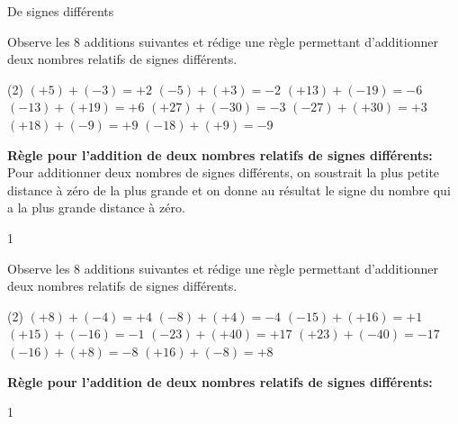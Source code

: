 \documentclass[a4paper,11pt]{report}
\begin{document}



\begin{resolu}
{De signes différents}{Observe les 8 additions suivantes et rédige une règle permettant d'additionner deux nombres relatifs de signes différents.
\begin{tasks}(2)
\task $(+5)+(-3)= +2$
\task $(-5)+(+3)= -2$
\task $(+13)+(-19)= -6$
\task $(-13)+(+19)= +6$
\task $(+27)+(-30)= -3$
\task $(-27)+(+30)= +3$
\task $(+18)+(-9)= +9$
\task $(-18)+(+9)= -9$
\end{tasks}

{\bf Règle pour l'addition de deux nombres relatifs de signes différents:} Pour additionner deux nombres de signes différents, on soustrait la plus petite distance à zéro de la plus grande et on donne au résultat le signe du nombre qui a la plus grande distance à zéro.
}{1}
\end{resolu}

\begin{exop}
{Observe les 8 additions suivantes et rédige une règle permettant d'additionner deux nombres relatifs de signes différents.
\begin{tasks}(2)
\task $(+8)+(-4)= +4$
\task $(-8)+(+4)= -4$
\task $(-15)+(+16)= +1$
\task $(+15)+(-16)= -1$
\task $(-23)+(+40)= +17$
\task $(+23)+(-40)= -17$
\task $(-16)+(+8)= -8$
\task $(+16)+(-8)= +8$
\end{tasks}

{\bf Règle pour l'addition de deux nombres relatifs de signes différents:} 

\hrulefill

\hrulefill

}{1}
\end{exop}



\end{document}

